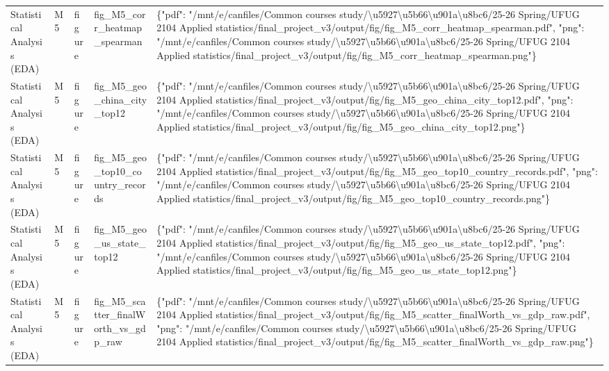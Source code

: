 \begin{tabular}{lllll}
Statistical Analysis (EDA) & M5 & figure & fig\_M5\_corr\_heatmap\_spearman & \{"pdf": "/mnt/e/canfiles/Common courses study/\textbackslash u5927\textbackslash u5b66\textbackslash u901a\textbackslash u8bc6/25-26 Spring/UFUG 2104 Applied statistics/final\_project\_v3/output/fig/fig\_M5\_corr\_heatmap\_spearman.pdf", "png": "/mnt/e/canfiles/Common courses study/\textbackslash u5927\textbackslash u5b66\textbackslash u901a\textbackslash u8bc6/25-26 Spring/UFUG 2104 Applied statistics/final\_project\_v3/output/fig/fig\_M5\_corr\_heatmap\_spearman.png"\} \\
Statistical Analysis (EDA) & M5 & figure & fig\_M5\_geo\_china\_city\_top12 & \{"pdf": "/mnt/e/canfiles/Common courses study/\textbackslash u5927\textbackslash u5b66\textbackslash u901a\textbackslash u8bc6/25-26 Spring/UFUG 2104 Applied statistics/final\_project\_v3/output/fig/fig\_M5\_geo\_china\_city\_top12.pdf", "png": "/mnt/e/canfiles/Common courses study/\textbackslash u5927\textbackslash u5b66\textbackslash u901a\textbackslash u8bc6/25-26 Spring/UFUG 2104 Applied statistics/final\_project\_v3/output/fig/fig\_M5\_geo\_china\_city\_top12.png"\} \\
Statistical Analysis (EDA) & M5 & figure & fig\_M5\_geo\_top10\_country\_records & \{"pdf": "/mnt/e/canfiles/Common courses study/\textbackslash u5927\textbackslash u5b66\textbackslash u901a\textbackslash u8bc6/25-26 Spring/UFUG 2104 Applied statistics/final\_project\_v3/output/fig/fig\_M5\_geo\_top10\_country\_records.pdf", "png": "/mnt/e/canfiles/Common courses study/\textbackslash u5927\textbackslash u5b66\textbackslash u901a\textbackslash u8bc6/25-26 Spring/UFUG 2104 Applied statistics/final\_project\_v3/output/fig/fig\_M5\_geo\_top10\_country\_records.png"\} \\
Statistical Analysis (EDA) & M5 & figure & fig\_M5\_geo\_us\_state\_top12 & \{"pdf": "/mnt/e/canfiles/Common courses study/\textbackslash u5927\textbackslash u5b66\textbackslash u901a\textbackslash u8bc6/25-26 Spring/UFUG 2104 Applied statistics/final\_project\_v3/output/fig/fig\_M5\_geo\_us\_state\_top12.pdf", "png": "/mnt/e/canfiles/Common courses study/\textbackslash u5927\textbackslash u5b66\textbackslash u901a\textbackslash u8bc6/25-26 Spring/UFUG 2104 Applied statistics/final\_project\_v3/output/fig/fig\_M5\_geo\_us\_state\_top12.png"\} \\
Statistical Analysis (EDA) & M5 & figure & fig\_M5\_scatter\_finalWorth\_vs\_gdp\_raw & \{"pdf": "/mnt/e/canfiles/Common courses study/\textbackslash u5927\textbackslash u5b66\textbackslash u901a\textbackslash u8bc6/25-26 Spring/UFUG 2104 Applied statistics/final\_project\_v3/output/fig/fig\_M5\_scatter\_finalWorth\_vs\_gdp\_raw.pdf", "png": "/mnt/e/canfiles/Common courses study/\textbackslash u5927\textbackslash u5b66\textbackslash u901a\textbackslash u8bc6/25-26 Spring/UFUG 2104 Applied statistics/final\_project\_v3/output/fig/fig\_M5\_scatter\_finalWorth\_vs\_gdp\_raw.png"\} \\

\end{tabular}
